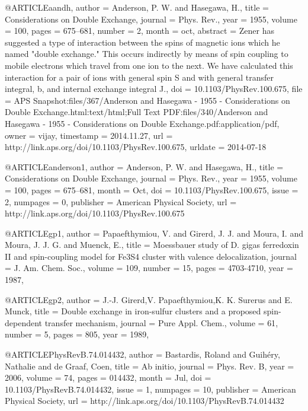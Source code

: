 @ARTICLE{aandh,
  author = {Anderson, P. W. and Hasegawa, H.},
  title = {Considerations on Double Exchange},
  journal = {Phys. Rev.},
  year = {1955},
  volume = {100},
  pages = {675--681},
  number = {2},
  month = oct,
  abstract = {Zener has suggested a type of interaction between the spins of magnetic
	ions which he named "double exchange." This occurs indirectly by
	means of spin coupling to mobile electrons which travel from one
	ion to the next. We have calculated this interaction for a pair of
	ions with general spin S and with general transfer integral, b, and
	internal exchange integral J.},
  doi = {10.1103/PhysRev.100.675},
  file = {APS Snapshot:files/367/Anderson and Hasegawa - 1955 - Considerations on Double Exchange.html:text/html;Full Text PDF:files/340/Anderson and Hasegawa - 1955 - Considerations on Double Exchange.pdf:application/pdf},
  owner = {vijay},
  timestamp = {2014.11.27},
  url = {http://link.aps.org/doi/10.1103/PhysRev.100.675},
  urldate = {2014-07-18}
}

@ARTICLE{anderson1,
  author = {Anderson, P. W. and Hasegawa, H.},
  title = {Considerations on Double Exchange},
  journal = {Phys. Rev.},
  year = {1955},
  volume = {100},
  pages = {675--681},
  month = {Oct},
  doi = {10.1103/PhysRev.100.675},
  issue = {2},
  numpages = {0},
  publisher = {American Physical Society},
  url = {http://link.aps.org/doi/10.1103/PhysRev.100.675}
}

@ARTICLE{gp1,
author = {Papaefthymiou, V. and Girerd, J. J. and Moura, I. and Moura, J. J. G. and Muenck, E.},
title = {Moessbauer study of D. gigas ferredoxin II and spin-coupling model for Fe3S4 cluster with valence delocalization},
journal = {J. Am. Chem. Soc.},
volume = {109},
number = {15},
pages = {4703-4710},
year = {1987},
}

@ARTICLE{gp2,
author = {J.-J. Girerd,V. Papaefthymiou,K. K. Surerus and E. Munck},
title = {Double exchange in iron-sulfur clusters and a proposed spin-dependent transfer mechanism},
journal = {Pure Appl. Chem.},
volume = {61},
number = {5},
pages = {805},
year = {1989},
}

@ARTICLE{PhysRevB.74.014432,
  author = {Bastardis, Roland and Guih{\'e}ry, Nathalie and de Graaf, Coen},
  title = {Ab initio},
  journal = {Phys. Rev. B},
  year = {2006},
  volume = {74},
  pages = {014432},
  month = {Jul},
  doi = {10.1103/PhysRevB.74.014432},
  issue = {1},
  numpages = {10},
  publisher = {American Physical Society},
  url = {http://link.aps.org/doi/10.1103/PhysRevB.74.014432}
}

